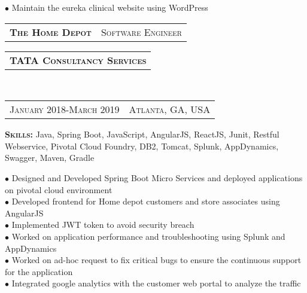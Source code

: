 \documentclass[10pt,a4paper,oneside]{article}
\begin{document}
\begin{minipage}[t]{0.55\textwidth}
\begin{adjustwidth}{7pt}{0pt}
{        $\bullet$ Maintain the eureka clinical website using WordPress}\\
        \end{adjustwidth}
        \begin{tabular}{c|c}
            \textbf{\normalsize T\textsc{he} H\textsc{ome} D\textsc{epot}}
            &\textmd{\normalsize S\textsc{oftware} E\textsc{ngineer}}\\
        \end{tabular}
        \begin{tabular}{c}
            \textbf{\normalsize TATA C\textsc{onsultancy} S\textsc{ervices}}
        \end{tabular}\\
        \textcolor{light-gray}{
            \begin{tabular}{c|c}
                {\small J\textsc{anuary 2018}-M\textsc{arch 2019}}
                &{\small A\textsc{tlanta}, G\textsc{A}, U\textsc{SA}}
            \end{tabular}
        }
        \vspace{2mm} 
       \begin{adjustwidth}{7pt}{0pt}
            \textbf{S\textsc{kills: }} \small{Java, Spring Boot, JavaScript, AngularJS, ReactJS, Junit, Restful Webservice, Pivotal Cloud Foundry, DB2, Tomcat, Splunk, AppDynamics, Swagger, Maven, Gradle}
        \end{adjustwidth}
        \vspace{1mm}
        \begin{adjustwidth}{7pt}{0pt}
            {\footnotesize $\bullet$ Designed and Developed Spring Boot Micro Services and deployed applications on pivotal cloud environment\\
            $\bullet$ Developed frontend for Home depot customers and store associates using AngularJS\\
            $\bullet$ Implemented JWT token to avoid security breach\\
            $\bullet$ Worked on application performance and troubleshooting using Splunk and AppDynamics\\
            $\bullet$ Worked on ad-hoc request to fix critical bugs to ensure the continuous support for the application\\
            $\bullet$ Integrated google analytics with the customer web portal to analyze the traffic}\\
        \end{adjustwidth}
        

\end{minipage}
\end{document}
